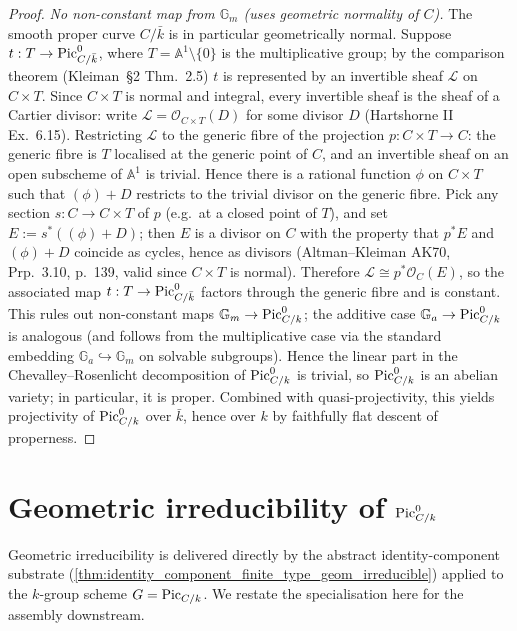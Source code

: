 \begin{proof}
  \emph{No non-constant map from \(\mathbb{G}_m\) (uses geometric
  normality of \(C\)).} The smooth proper curve \(C/\bar k\) is
  in particular geometrically normal. Suppose
  \(t : T \to \operatorname{Pic}^0_{C/\bar k}\), where \(T = \mathbb{A}^1
  \setminus \{0\}\) is the multiplicative group; by the comparison
  theorem (Kleiman~\S 2 Thm.~2.5) \(t\) is represented by an
  invertible sheaf \(\mathcal{L}\) on \(C \times T\). Since
  \(C \times T\) is normal and integral, every invertible sheaf is the
  sheaf of a Cartier divisor: write
  \(\mathcal{L} = \mathcal{O}_{C \times T}(D)\) for some divisor \(D\)
  (Hartshorne II Ex.~6.15). Restricting \(\mathcal{L}\) to the generic
  fibre of the projection \(p : C \times T \to C\): the generic fibre
  is \(T\) localised at the generic point of \(C\), and an invertible
  sheaf on an open subscheme of \(\mathbb{A}^1\) is trivial. Hence
  there is a rational function \(\phi\) on \(C \times T\) such that
  \((\phi) + D\) restricts to the trivial divisor on the generic
  fibre. Pick any section \(s : C \to C \times T\) of \(p\) (e.g.\ at
  a closed point of \(T\)), and set \(E := s^*((\phi) + D)\); then
  \(E\) is a divisor on \(C\) with the property that \(p^* E\) and
  \((\phi) + D\) coincide as cycles, hence as divisors (Altman--Kleiman
  AK70, Prp.~3.10, p.~139, valid since \(C \times T\) is normal).
  Therefore \(\mathcal{L} \cong p^* \mathcal{O}_C(E)\), so the
  associated map \(t : T \to \operatorname{Pic}^0_{C/\bar k}\) factors through the
  generic fibre and is constant. This rules out non-constant maps
  \(\mathbb{G}_m \to \operatorname{Pic}^0_{C/k}\); the additive case
  \(\mathbb{G}_a \to \operatorname{Pic}^0_{C/k}\) is analogous (and follows from the
  multiplicative case via the standard embedding
  \(\mathbb{G}_a \hookrightarrow \mathbb{G}_m\) on solvable
  subgroups). Hence the linear part in the Chevalley--Rosenlicht
  decomposition of \(\operatorname{Pic}^0_{C/k}\) is trivial, so \(\operatorname{Pic}^0_{C/k}\) is
  an abelian variety; in particular, it is proper. Combined with
  quasi-projectivity, this yields projectivity of \(\operatorname{Pic}^0_{C/k}\)
  over \(\bar k\), hence over \(k\) by faithfully flat descent of
  properness.
\end{proof}

\section{Geometric irreducibility of \(\operatorname{Pic}^0_{C/k}\)}
\label{sec:pic0_geom_irred}

Geometric irreducibility is delivered directly by the abstract
identity-component substrate
(\cref{thm:identity_component_finite_type_geom_irreducible}) applied
to the \(k\)-group scheme \(G = \operatorname{Pic}_{C/k}\). We restate the
specialisation here for the assembly downstream.

